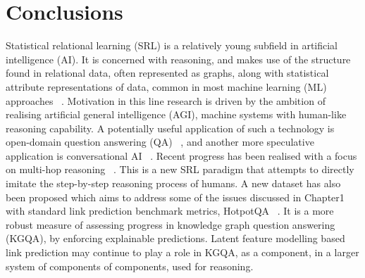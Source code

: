 
\chapter{Conclusions}  %

\ifpdf
    \graphicspath{{Chapter5/Figs/Raster/}{Chapter5/Figs/PDF/}{Chapter5/Figs/}}
\else
    \graphicspath{{Chapter5/Figs/Vector/}{Chapter5/Figs/}}
\fi



Statistical relational learning (SRL) is a relatively young subfield in artificial intelligence (AI). It is concerned with reasoning, and makes use of the structure found in relational data, often represented as graphs, along with statistical attribute representations of data, common in most machine learning (ML) approaches \unskip~\citep{koller2007introduction}. Motivation in this line research is driven by the ambition of realising artificial general intelligence (AGI), machine systems with human-like reasoning capability. A potentially useful application of such a technology is open-domain question answering (QA) \unskip~\citep{chen2017reading}, and another more speculative application is conversational AI \unskip~\citep{moon2019opendialkg, basu2019conversational}. Recent progress has been realised with a focus on multi-hop reasoning \unskip~\citep{asai2019learning, lin2018multi, qi2019answering}. This is a new SRL paradigm that attempts to directly imitate the step-by-step reasoning process of humans. A new dataset has also been proposed which aims to address some of the issues discussed in Chapter1 with standard link prediction benchmark metrics, HotpotQA \unskip~\citep{yang2018hotpotqa}. It is a more robust measure of assessing progress in knowledge graph question answering (KGQA), by enforcing explainable predictions. Latent feature modelling based link prediction may continue to play a role in KGQA, as a component, in a larger system of components of components, used for reasoning. \par   

